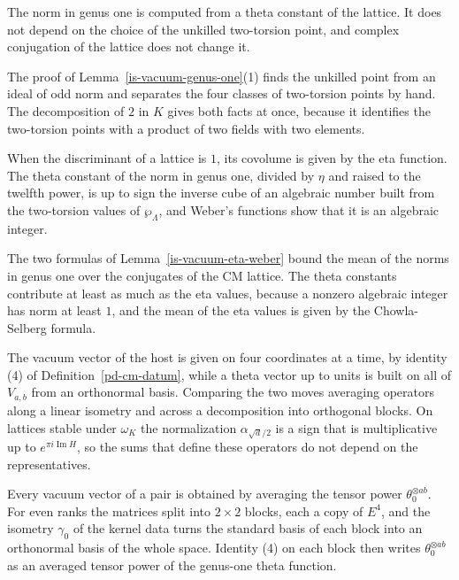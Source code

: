 The norm in genus one is computed from a theta constant of the lattice. It does not depend on the
choice of the unkilled two-torsion point, and complex conjugation of the lattice does not change it.

The proof of Lemma~\ref{is-vacuum-genus-one}(1) finds the unkilled point from an ideal of odd norm
and separates the four classes of two-torsion points by hand. The decomposition of $2$ in $K$ gives
both facts at once, because it identifies the two-torsion points with a product of two fields with
two elements.

When the discriminant of a lattice is $1$, its covolume is given by the eta function. The theta
constant of the norm in genus one, divided by $\eta$ and raised to the twelfth power, is up to sign
the inverse cube of an algebraic number built from the two-torsion values of $\wp_\Lambda$, and
Weber's functions show that it is an algebraic integer.

The two formulas of Lemma~\ref{is-vacuum-eta-weber} bound the mean of the norms in genus one over the
conjugates of the CM lattice. The theta constants contribute at least as much as the eta values,
because a nonzero algebraic integer has norm at least $1$, and the mean of the eta values is given by
the Chowla-Selberg formula.

The vacuum vector of the host is given on four coordinates at a time, by identity (4) of
Definition~\ref{pd-cm-datum}, while a theta vector up to units is built on all of $V_{a,b}$ from an
orthonormal basis. Comparing the two moves averaging operators along a linear isometry and across a
decomposition into orthogonal blocks. On lattices stable under $\omega_K$ the normalization
$\alpha_{\sqrt d/2}$ is a sign that is multiplicative up to $e^{\pi i\operatorname{Im}H}$, so the sums that
define these operators do not depend on the representatives.

Every vacuum vector of a pair is obtained by averaging the tensor power $\theta_0^{\otimes ab}$. For
even ranks the matrices split into $2\times2$ blocks, each a copy of $E^4$, and the isometry
$\gamma_0$ of the kernel data turns the standard basis of each block into an orthonormal basis of the
whole space. Identity (4) on each block then writes $\theta_0^{\otimes ab}$ as an averaged tensor power
of the genus-one theta function.

